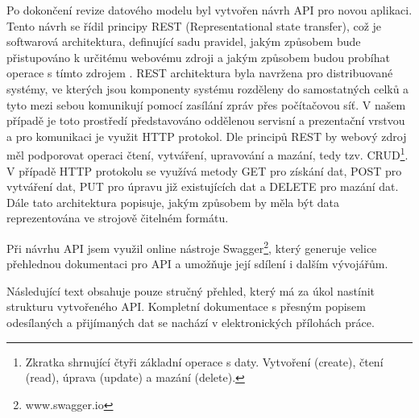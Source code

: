 \documentclass[
  digital, %
  twoside, %
  table,   %
  lof,     %
  lot,     %
]{fithesis3}
\begin{document}
Po dokončení revize datového modelu byl vytvořen návrh API pro novou aplikaci. Tento návrh se řídil principy REST (Representational state transfer), což je softwarová architektura, definující sadu pravidel, jakým způsobem bude přistupováno k určitému webovému zdroji a jakým způsobem budou probíhat operace s tímto zdrojem \cite{RoyThomasFielding2000ArchitecturalArchitectures}.
REST architektura byla navržena pro distribuované systémy, ve kterých jsou komponenty systému rozděleny do samostatných celků a tyto mezi sebou komunikují pomocí zasílání zpráv přes počítačovou síť. V našem případě je toto prostředí představováno oddělenou servisní a prezentační vrstvou a pro komunikaci je využit HTTP protokol.  Dle principů REST by webový zdroj měl podporovat operaci čtení, vytváření, upravování a mazání, tedy tzv. CRUD\footnote{Zkratka shrnující čtyři základní operace s daty. Vytvoření (create), čtení (read), úprava (update) a mazání (delete).}. V případě HTTP protokolu se využívá metody GET pro získání dat, POST pro vytváření dat, PUT pro úpravu již existujících dat a DELETE pro mazání dat. Dále tato architektura popisuje, jakým způsobem by měla být data reprezentována ve strojově čitelném formátu. \cite{RoyThomasFielding2000ArchitecturalArchitectures}

Při návrhu API jsem využil online nástroje Swagger\footnote{www.swagger.io}, který generuje velice přehlednou dokumentaci pro API a umožňuje její sdílení i dalším vývojářům.

Následující text obsahuje pouze stručný přehled, který má za úkol nastínit strukturu vytvořeného API. Kompletní dokumentace s přesným popisem odesílaných a přijímaných dat se nachází v elektronických přílohách práce.
\end{document}

